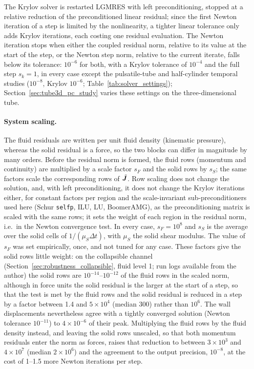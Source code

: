 The Krylov solver is restarted LGMRES with left preconditioning, stopped at a relative reduction of the preconditioned linear residual; since the first Newton iteration of a step is limited by the nonlinearity, a tighter linear tolerance only adds Krylov iterations, each costing one residual evaluation.
The Newton iteration stops when either the coupled residual norm, relative to its value at the start of the step, or the Newton step norm, relative to the current iterate, falls below its tolerance: $10^{-6}$ for both, with a Krylov tolerance of $10^{-4}$ and the full step $s_k = 1$, in every case except the pulsatile-tube and half-cylinder temporal studies ($10^{-8}$, Krylov $10^{-6}$; Table~\ref{tab:solver_settings}); Section~\ref{sec:tube3d_pc_study} varies these settings on the three-dimensional tube.

\paragraph{System scaling.}
The fluid residuals are written per unit fluid density (kinematic pressure), whereas the solid residual is a force, so the two blocks can differ in magnitude by many orders.
Before the residual norm is formed, the fluid rows (momentum and continuity) are multiplied by a scale factor $s_F$ and the solid rows by $s_S$; the same factors scale the corresponding rows of $\tilde{\boldsymbol{J}}$.
Row scaling does not change the solution, and, with left preconditioning, it does not change the Krylov iterations either, for constant factors per region and the scale-invariant sub-preconditioners used here (Schur \texttt{selfp}, ILU, LU, BoomerAMG), as the preconditioning matrix is scaled with the same rows; it sets the weight of each region in the residual norm, i.e.\ in the Newton convergence test.
In every case, $s_F = 10^{8}$ and $s_S$ is the average over the solid cells of $1/(\mu_S \Delta t)$, with $\mu_S$ the solid shear modulus.
The value of $s_F$ was set empirically, once, and not tuned for any case.
These factors give the solid rows little weight: on the collapsible channel (Section~\ref{sec:robustness_collapsible}, fluid level 1; run logs available from the author) the solid rows are $10^{-14}$--$10^{-12}$ of the fluid rows in the scaled norm, although in force units the solid residual is the larger at the start of a step, so that the test is met by the fluid rows and the solid residual is reduced in a step by a factor between 1.4 and $5\times10^4$ (median 300) rather than $10^6$.
The wall displacements nevertheless agree with a tightly converged solution (Newton tolerance $10^{-11}$) to $4\times10^{-6}$ of their peak.
Multiplying the fluid rows by the fluid density instead, and leaving the solid rows unscaled, so that both momentum residuals enter the norm as forces, raises that reduction to between $3\times10^3$ and $4\times10^7$ (median $2\times10^6$) and the agreement to the output precision, $10^{-8}$, at the cost of 1--1.5 more Newton iterations per step.

